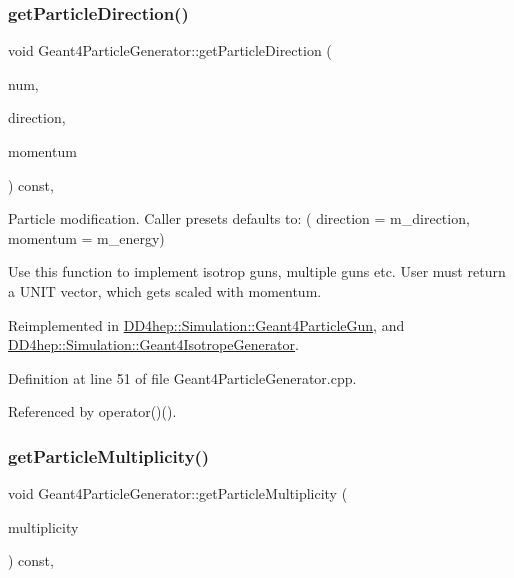 \subsubsection{\texorpdfstring{get\+Particle\+Direction()}{getParticleDirection()}}
{\footnotesize\ttfamily void Geant4\+Particle\+Generator\+::get\+Particle\+Direction (\begin{DoxyParamCaption}\item[{int}]{num,  }\item[{R\+O\+O\+T\+::\+Math\+::\+X\+Y\+Z\+Vector \&}]{direction,  }\item[{double \&}]{momentum }\end{DoxyParamCaption}) const\hspace{0.3cm}{\ttfamily [protected]}, {\ttfamily [virtual]}}



Particle modification. Caller presets defaults to\+: ( direction = m\+\_\+direction, momentum = m\+\_\+energy) 

Use this function to implement isotrop guns, multiple guns etc. User must return a U\+N\+IT vector, which gets scaled with momentum. 

Reimplemented in \hyperlink{class_d_d4hep_1_1_simulation_1_1_geant4_particle_gun_a442d44c1db6bfe109a1c129859900e55}{D\+D4hep\+::\+Simulation\+::\+Geant4\+Particle\+Gun}, and \hyperlink{class_d_d4hep_1_1_simulation_1_1_geant4_isotrope_generator_a6073247e3b5c587af44fcfb92fac6849}{D\+D4hep\+::\+Simulation\+::\+Geant4\+Isotrope\+Generator}.



Definition at line 51 of file Geant4\+Particle\+Generator.\+cpp.



Referenced by operator()().

\hypertarget{class_d_d4hep_1_1_simulation_1_1_geant4_particle_generator_a641c865de37d428ede06ea6dc4ae5f33}{}\label{class_d_d4hep_1_1_simulation_1_1_geant4_particle_generator_a641c865de37d428ede06ea6dc4ae5f33} 
\subsubsection{\texorpdfstring{get\+Particle\+Multiplicity()}{getParticleMultiplicity()}}
{\footnotesize\ttfamily void Geant4\+Particle\+Generator\+::get\+Particle\+Multiplicity (\begin{DoxyParamCaption}\item[{int \&}]{multiplicity }\end{DoxyParamCaption}) const\hspace{0.3cm}{\ttfamily [protected]}, {\ttfamily [virtual]}}



